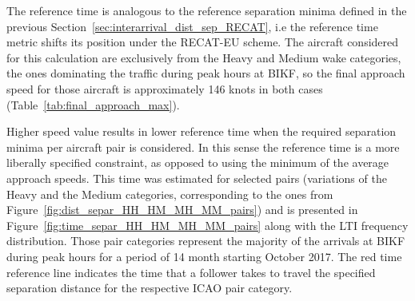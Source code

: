 The reference time is analogous to the reference separation minima defined in the previous Section~\ref{sec:interarrival_dist_sep_RECAT}, i.e the reference time metric shifts its position under the RECAT-EU scheme. The aircraft considered for this calculation are exclusively from the Heavy and Medium wake categories, the ones dominating the traffic during peak hours at BIKF, so the final approach speed for those aircraft is approximately 146 knots in both cases (Table~\ref{tab:final_approach_max}).

\begin{table}[h]
\centering
{}
\caption[Maximum average final approach speeds]{Average final approach speeds for Heavy and Medium followers per runway. The final approach speed is calculated by Isavia from the aircraft ground speed at 4 nautical miles away from the threshold on approach for landing for each of the runways.}
\label{tab:final_approach_max}
\end{table}

Higher speed value results in lower reference time when the required separation minima per aircraft pair is considered. In this sense the reference time is a more liberally specified constraint, as opposed to using the minimum of the average approach speeds. This time was estimated for selected pairs (variations of the Heavy and the Medium categories, corresponding to the ones from Figure~\ref{fig:dist_separ_HH_HM_MH_MM_pairs}) and is presented in Figure~\ref{fig:time_separ_HH_HM_MH_MM_pairs} along with the LTI frequency distribution. Those pair categories represent the majority of the arrivals at BIKF during peak hours for a period of 14 month starting October 2017. The red time reference line indicates the time that a follower takes to travel the specified separation distance for the respective ICAO pair category.

